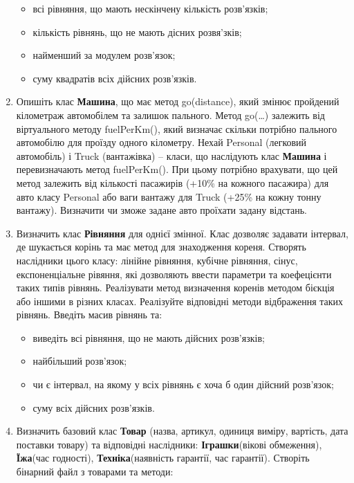 \documentclass[]{article}
\begin{document}
\begin{enumerate}
  \begin{itemize}
  \item
    всі рівняння, що мають нескінчену кількість розв'язків;
  \item
    кількість рівнянь, що не мають дісних розвя'зків;
  \item
    найменший за модулем розв'язок;
  \item
    суму квадратів всіх дійсних розв'язків.
  \end{itemize}
\item
  Опишіть клас \textbf{Машина}, що має метод go(distance), який змінює
  пройдений кілометраж автомобілем та залишок пального. Метод
  go(\ldots{}) залежить від віртуального методу fuelPerKm(), який
  визначає скільки потрібно пального автомобілю для проїзду одного
  кілометру. Нехай Personal (легковий автомобіль) і Truck (вантажівка)
  -- класи, що наслідують клас \textbf{Машина} і перевизначають метод
  fuelPerKm(). При цьому потрібно врахувати, що цей метод залежить від
  кількості пасажирів (+10\% на кожного пасажира) для авто класу
  Personal або ваги вантажу для Truck (+25\% на кожну тонну вантажу).
  Визначити чи зможе задане авто проїхати задану відстань.
\item
  Визначить клас \textbf{Рівняння} для однієї змінної. Клас дозволяє
  задавати інтервал, де шукається корінь та має метод для знаходження
  кореня. Створять наслідники цього класу: лінійне рівняння, кубічне
  рівняння, сінус, експоненціальне рівяння, які дозволяють ввести
  параметри та коефецієнти таких типів рівнянь. Реалізувати метод
  визначення коренів методом бієкція або іншими в різних класах.
  Реалізуйте відповідні методи відбраження таких рівнянь. Введіть масив
  рівнянь та:

  \begin{itemize}
  \item
    виведіть всі рівняння, що не мають дійсних розв'язків;
  \item
    найбільший розв'язок;
  \item
    чи є інтервал, на якому у всіх рівнянь є хоча б один дійсний
    розв'язок;
  \item
    суму всіх дійсних розв'язків.
  \end{itemize}
\item
  Визначить базовий клас \textbf{Товар} (назва, артикул, одиниця виміру,
  вартість, дата поставки товару) та відповідні наслідники:
  \textbf{Іграшки}(вікові обмеження), \textbf{Їжа}(час годності),
  \textbf{Техніка}(наявність гарантії, час гарантії). Створіть бінарний
  файл з товарами та методи:


\end{enumerate}
\end{document}

